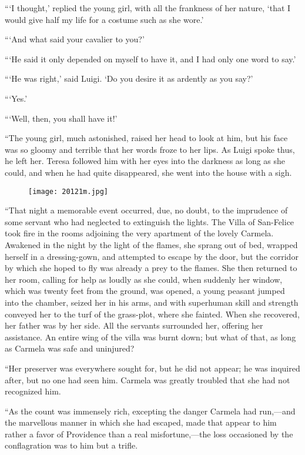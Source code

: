 “‘I thought,’ replied the young girl, with all the frankness of her
nature, ‘that I would give half my life for a costume such as she
wore.’

“‘And what said your cavalier to you?’

“‘He said it only depended on myself to have it, and I had only one
word to say.’

“‘He was right,’ said Luigi. ‘Do you desire it as ardently as you say?’

“‘Yes.’

“‘Well, then, you shall have it!’

“The young girl, much astonished, raised her head to look at him, but
his face was so gloomy and terrible that her words froze to her lips.
As Luigi spoke thus, he left her. Teresa followed him with her eyes
into the darkness as long as she could, and when he had quite
disappeared, she went into the house with a sigh.

\begin{figure}[ht]
\texttt{[image: 20121m.jpg]}
\end{figure}

“That night a memorable event occurred, due, no doubt, to the
imprudence of some servant who had neglected to extinguish the lights.
The Villa of San-Felice took fire in the rooms adjoining the very
apartment of the lovely Carmela. Awakened in the night by the light of
the flames, she sprang out of bed, wrapped herself in a dressing-gown,
and attempted to escape by the door, but the corridor by which she
hoped to fly was already a prey to the flames. She then returned to her
room, calling for help as loudly as she could, when suddenly her
window, which was twenty feet from the ground, was opened, a young
peasant jumped into the chamber, seized her in his arms, and with
superhuman skill and strength conveyed her to the turf of the
grass-plot, where she fainted. When she recovered, her father was by
her side. All the servants surrounded her, offering her assistance. An
entire wing of the villa was burnt down; but what of that, as long as
Carmela was safe and uninjured?

“Her preserver was everywhere sought for, but he did not appear; he was
inquired after, but no one had seen him. Carmela was greatly troubled
that she had not recognized him.

“As the count was immensely rich, excepting the danger Carmela had
run,—and the marvellous manner in which she had escaped, made that
appear to him rather a favor of Providence than a real misfortune,—the
loss occasioned by the conflagration was to him but a trifle.

